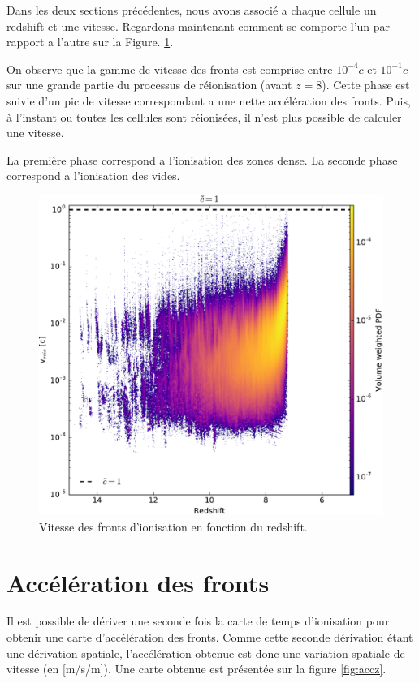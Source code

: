 Dans les deux sections précédentes, nous avons associé a chaque cellule un redshift et une vitesse.
Regardons maintenant comment se comporte l'un par rapport a l'autre sur la Figure. \ref{fig:speedz}.

On observe que la gamme de vitesse des fronts est comprise entre $10^{-4}c$ et $10^{-1}c$ sur une grande partie du processus de réionisation (avant $z=8$).
Cette phase est suivie d'un pic de vitesse correspondant a une nette accélération des fronts. 
Puis, à l'instant ou toutes les cellules sont réionisées, il n'est plus possible de calculer une vitesse.

La première phase correspond a l'ionisation des zones dense.
La seconde phase correspond a l'ionisation des vides.

\begin{figure}[htpb]
        \includegraphics[width=.95\linewidth]{img/04_mapreio/speedreio_z_c1.pdf} 
        \caption{Vitesse des fronts d'ionisation en fonction du redshift.
        }
 		\label{fig:speedz}
\end{figure}



\section{Accélération des fronts}

Il est possible de dériver une seconde fois la carte de temps d'ionisation pour obtenir une carte d'accélération des fronts.
Comme cette seconde dérivation étant une dérivation spatiale, l'accélération obtenue est donc une variation spatiale de vitesse (en [m/s/m]).
Une carte obtenue est présentée sur la figure \ref{fig:accz}.

